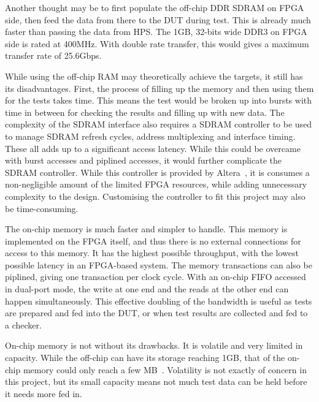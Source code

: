 Another thought may be to first populate the off-chip DDR SDRAM on FPGA
side, then feed the data from there to the DUT during test.
This is already much faster than passing the data from HPS.
The 1GB, 32-bits wide DDR3 on FPGA side is rated at 400MHz.
With double rate transfer, this would gives a maximum transfer rate of 25.6Gbps.

While using the off-chip RAM may theoretically achieve the targets,
it still has its disadvantages.
First, the process of filling up the memory and then using them for the tests
takes time.
This means the test would be broken up into bursts with time in between for
checking the results and filling up with new data.
The complexity of the SDRAM interface also requires a SDRAM controller to be
used to manage SDRAM refresh cycles, address multiplexing and interface timing.
These all adds up to a significant access latency.
While this could be overcame with burst accesses and piplined accesses,
it would further complicate the SDRAM controller.
While this controller is provided by Altera~\cite{Altera3}, it is consumes
a non-negligible amount of the limited FPGA resources, while adding
unnecessary complexity to the design.
Customising the controller to fit this project may also be time-consuming.

The on-chip memory is much faster and simpler to handle.
This memory is implemented on the FPGA itself, and thus there is no external
connections for access to this memory.
It has the highest possible throughput, with the lowest possible latency
in an FPGA-based system.
The memory transactions can also be piplined, giving one transaction per
clock cycle.
With an on-chip FIFO accessed in dual-port mode, the write at one end and the
reads at the other end can happen simultaneously.
This effective doubling of the bandwidth is useful as tests are prepared
and fed into the DUT, or when test results are collected and fed to a checker.

On-chip memory is not without its drawbacks.
It is volatile and very limited in capacity.
While the off-chip can have its storage reaching 1GB, that of the on-chip
memory could only reach a few MB~\cite{Altera2}.
Volatility is not exactly of concern in this project, but its small capacity
means not much test data can be held before it needs more fed in.


